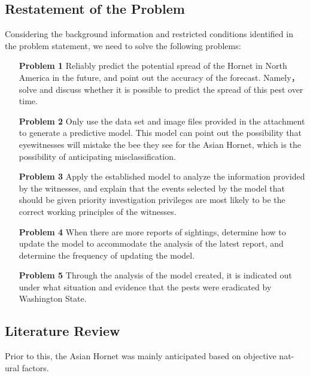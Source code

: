 \documentclass{mcmthesis}
\begin{document}
\subsection{Restatement of the Problem}  
Considering the background information and restricted conditions identified in the problem statement, we need to solve the following problems:
\begin{enumerate}
	\item[\textbf{Problem 1}]Reliably predict the potential spread of the Hornet in North America in the future, and point out the accuracy of the forecast. Namely，solve and discuss whether it is possible to predict the spread of this pest over time.
	\item[\textbf{Problem 2}]Only use the data set and image files provided in the attachment to generate a predictive model. This model can point out the possibility that eyewitnesses will mistake the bee they see for the Asian Hornet, which is the possibility of anticipating misclassification.
	\item[\textbf{Problem 3}] Apply the established model to analyze the information provided by the witnesses, and explain that the events selected by the model that should be given priority investigation privileges are most likely to be the correct working principles of the witnesses.
	\item[\textbf{Problem 4}]When there are more reports of sightings, determine how to update the model to accommodate the analysis of the latest report, and determine the frequency of updating the model.
	\item[\textbf{Problem 5}] Through the analysis of the model created, it is indicated out under what situation and evidence that the pests were eradicated by Washington State.
\end{enumerate}
\hspace*{\fill}
\subsection{Literature Review}
Prior to this, the Asian Hornet was mainly anticipated based on objective nat-ural factors. 
\end{document}
